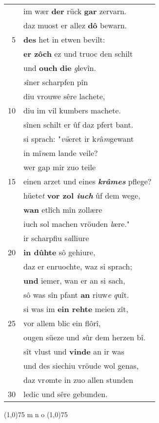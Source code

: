 \documentclass[8pt,a4paper,notitlepage]{article}
\begin{document}
\begin{table}[ht]
\begin{minipage}[t]{0.5\linewidth}
\begin{tabular}{rl}
 & im wær \textbf{der} rück \textbf{gar} zervarn.\\ 
 & daz muost er allez \textbf{dô} bewarn.\\ 
5 & \textbf{des} het in etwen bevilt:\\ 
 & \textbf{er zôch} ez und truoc den schilt\\ 
 & und \textbf{ouch} \textbf{die} \textit{g}levîn.\\ 
 & \textit{s}îner scharpfen pîn\\ 
 & diu vrouwe sêre lachete,\\ 
10 & diu im vil kumbers machete.\\ 
 & sînen schilt er ûf daz pfert bant.\\ 
 & si sprach: "\textit{vü}eret ir k\textit{r}â\textit{m}gewant\\ 
 & in mî\textit{n}em lande veile?\\ 
 & wer gap mir zuo teile\\ 
15 & einen arzet und eines \textit{\textbf{krâmes}} pflege?\\ 
 & hüete\textit{t} \textbf{vor zol \textit{iuch}} ûf dem wege,\\ 
 & \textbf{wan} etlîch mîn zollære\\ 
 & iuch sol machen vröuden \textit{l}ære."\\ 
 & ir scharpfiu s\textit{a}lliure\\ 
20 & \textbf{in dûhte} sô gehiure,\\ 
 & daz er enruochte, waz si sprach;\\ 
 & \textbf{und} iemer, wan er an si sach,\\ 
 & sô was sîn pfant \textbf{an} riuw\textit{e} \textit{q}uît.\\ 
 & si was im \textbf{ein rehte} meien zît,\\ 
25 & vor allem blic ein flôrî,\\ 
 & ougen süeze und \textit{s}ûr dem herzen bî.\\ 
 & sît vlust und \textbf{vinde} an ir was\\ 
 & und des siechiu vröude wol genas,\\ 
 & daz vr\textit{o}mte in zuo allen stunden\\ 
30 & ledic und sêre gebunden.\\ 
\end{tabular}
\scriptsize
\line(1,0){75} \newline
m n o \newline
\line(1,0){75} \newline

\end{minipage}
\end{table}
\end{document}
